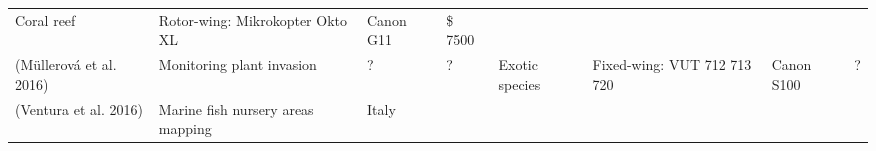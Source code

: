 \documentclass[]{interact}
\theoremstyle{plain}%
\theoremstyle{definition}
\theoremstyle{remark}
\begin{document}
\begin{longtable}[]{@{}llllllll@{}}
\begin{minipage}[t]{0.10\columnwidth}
Coral reef\strut
\end{minipage} & \begin{minipage}[t]{0.09\columnwidth}\raggedright\strut
Rotor-wing: Mikrokopter Okto XL\strut
\end{minipage} & \begin{minipage}[t]{0.11\columnwidth}\raggedright\strut
Canon G11\strut
\end{minipage} & \begin{minipage}[t]{0.01\columnwidth}\raggedright\strut
\$ 7500\strut
\end{minipage}\tabularnewline
\begin{minipage}[t]{0.11\columnwidth}\raggedright\strut
(Müllerová et al. 2016)\strut
\end{minipage} & \begin{minipage}[t]{0.18\columnwidth}\raggedright\strut
Monitoring plant invasion\strut
\end{minipage} & \begin{minipage}[t]{0.03\columnwidth}\raggedright\strut
?\strut
\end{minipage} & \begin{minipage}[t]{0.14\columnwidth}\raggedright\strut
?\strut
\end{minipage} & \begin{minipage}[t]{0.10\columnwidth}\raggedright\strut
Exotic species\strut
\end{minipage} & \begin{minipage}[t]{0.09\columnwidth}\raggedright\strut
Fixed-wing: VUT 712 713 720\strut
\end{minipage} & \begin{minipage}[t]{0.11\columnwidth}\raggedright\strut
Canon S100\strut
\end{minipage} & \begin{minipage}[t]{0.01\columnwidth}\raggedright\strut
?\strut
\end{minipage}\tabularnewline
\begin{minipage}[t]{0.11\columnwidth}\raggedright\strut
(Ventura et al. 2016)\strut
\end{minipage} & \begin{minipage}[t]{0.18\columnwidth}\raggedright\strut
Marine fish nursery areas mapping\strut
\end{minipage} & \begin{minipage}[t]{0.03\columnwidth}\raggedright\strut
Italy\strut
\end{minipage} & \begin{minipage}[t]{0.14\columnwidth}\raggedright\strut

\end{minipage}
\end{longtable}
\end{document}
